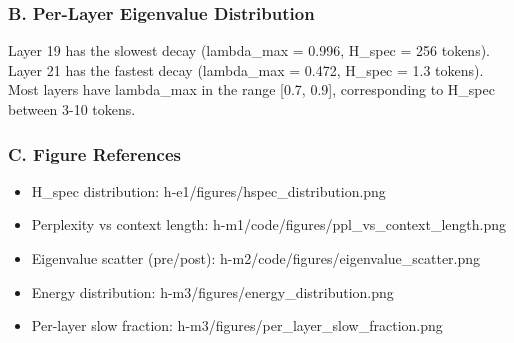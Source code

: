 \subsubsection{B. Per-Layer Eigenvalue Distribution}

Layer 19 has the slowest decay (lambda\_max = 0.996, H\_spec = 256 tokens). Layer 21 has the fastest decay (lambda\_max = 0.472, H\_spec = 1.3 tokens). Most layers have lambda\_max in the range [0.7, 0.9], corresponding to H\_spec between 3-10 tokens.

\subsubsection{C. Figure References}

\begin{itemize}
\item H\_spec distribution: h-e1/figures/hspec\_distribution.png
\item Perplexity vs context length: h-m1/code/figures/ppl\_vs\_context\_length.png
\item Eigenvalue scatter (pre/post): h-m2/code/figures/eigenvalue\_scatter.png
\item Energy distribution: h-m3/figures/energy\_distribution.png
\item Per-layer slow fraction: h-m3/figures/per\_layer\_slow\_fraction.png
\end{itemize}
